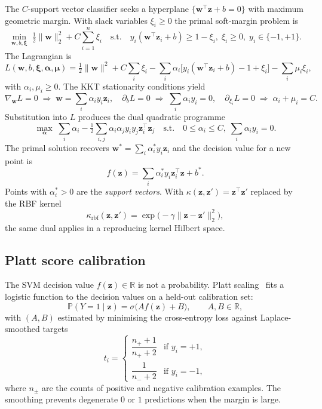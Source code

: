\documentclass[onluarkali,ingilizce,yukseklisans,karton,LisansustuEgitim]{itutez}
\providecommand{\R}{\mathbb{R}}
\providecommand{\Prob}{\mathbb{P}}
\providecommand{\1}{\mathbf{1}}
\begin{document}
The $C$-support vector classifier seeks a hyperplane $\{\boldsymbol{w}^\top\mathbf{z}+b=0\}$ with maximum geometric margin. With slack variables $\xi_i\geq 0$ the primal soft-margin problem is
\begin{equation}
  \min_{\boldsymbol w,b,\boldsymbol\xi}\;
  \tfrac12\|\boldsymbol w\|_2^2+C\sum_{i=1}^n\xi_i
  \quad\text{s.t.}\quad
  y_i(\boldsymbol w^\top\mathbf{z}_i+b)\geq 1-\xi_i,\;
  \xi_i\geq 0,\;
  y_i\in\{-1,+1\}.
  \label{eq:svm-primal}
\end{equation}
The Lagrangian is
\[
  L(\boldsymbol w,b,\boldsymbol\xi,\boldsymbol\alpha,\boldsymbol\mu)
  =\tfrac12\|\boldsymbol w\|^2+C\sum_i\xi_i
  -\sum_i\alpha_i\bigl[y_i(\boldsymbol w^\top\mathbf{z}_i+b)-1+\xi_i\bigr]
  -\sum_i\mu_i\xi_i,
\]
with $\alpha_i,\mu_i\geq 0$. The KKT stationarity conditions yield
\[
  \nabla_{\boldsymbol w}L=0\;\Rightarrow\;\boldsymbol w=\sum_i\alpha_iy_i\mathbf{z}_i,
  \quad
  \partial_bL=0\;\Rightarrow\;\sum_i\alpha_iy_i=0,
  \quad
  \partial_{\xi_i}L=0\;\Rightarrow\;\alpha_i+\mu_i=C.
\]
Substitution into $L$ produces the dual quadratic programme
\begin{equation}
  \max_{\boldsymbol\alpha}\;\sum_i\alpha_i-\tfrac12\sum_{i,j}\alpha_i\alpha_jy_iy_j\mathbf{z}_i^\top\mathbf{z}_j
  \quad\text{s.t.}\quad
  0\leq\alpha_i\leq C,\;\sum_i\alpha_iy_i=0.
  \label{eq:svm-dual}
\end{equation}
The primal solution recovers $\boldsymbol w^*=\sum_i\alpha_i^*y_i\mathbf{z}_i$ and the decision value for a new point is
\begin{equation}
  f(\mathbf{z})=\sum_i\alpha_i^*y_i\mathbf{z}_i^\top\mathbf{z}+b^*.
  \label{eq:svm-decision}
\end{equation}
Points with $\alpha_i^*>0$ are the \emph{support vectors}. With $\kappa(\mathbf z,\mathbf z')=\mathbf z^\top\mathbf z'$ replaced by the RBF kernel
\[
  \kappa_{\mathrm{rbf}}(\mathbf z,\mathbf z')=\exp\bigl(-\gamma\|\mathbf z-\mathbf z'\|_2^2\bigr),
\]
the same dual applies in a reproducing kernel Hilbert space.

\subsection{Platt score calibration}
\label{subsubsec:platt}

The SVM decision value $f(\mathbf z)\in\R$ is not a probability. Platt scaling~\parencite{platt1999probabilistic} fits a logistic function to the decision values on a held-out calibration set:
\begin{equation}
  \Prob(Y=1\mid\mathbf{z})=\sigma\bigl(Af(\mathbf{z})+B\bigr),
  \qquad A,B\in\R,
  \label{eq:platt}
\end{equation}
with $(A,B)$ estimated by minimising the cross-entropy loss against Laplace-smoothed targets
\[
  t_i=\begin{cases}\dfrac{n_++1}{n_++2}&\text{if }y_i=+1,\\[4pt]\dfrac{1}{n_-+2}&\text{if }y_i=-1,\end{cases}
\]
where $n_\pm$ are the counts of positive and negative calibration examples. The smoothing prevents degenerate $0$ or $1$ predictions when the margin is large.
\end{document}
